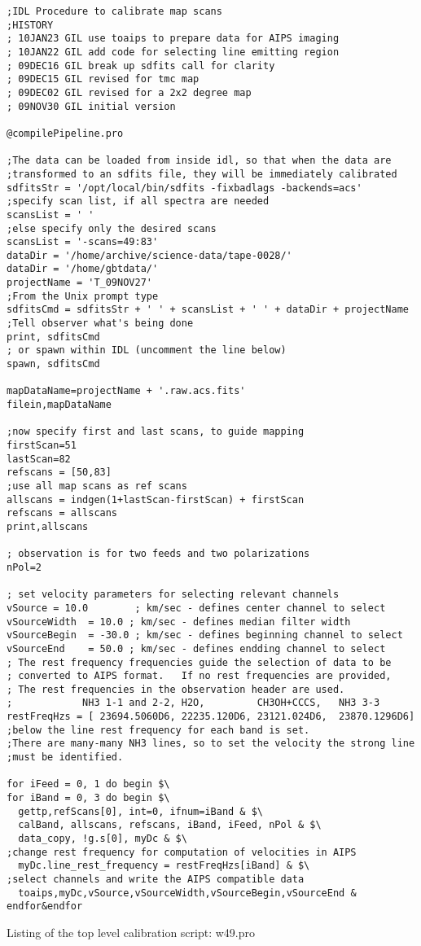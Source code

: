 \documentclass[12pt,twoside]{article}
\begin{document}
\begin{verbatim}
;IDL Procedure to calibrate map scans
;HISTORY
; 10JAN23 GIL use toaips to prepare data for AIPS imaging
; 10JAN22 GIL add code for selecting line emitting region
; 09DEC16 GIL break up sdfits call for clarity
; 09DEC15 GIL revised for tmc map
; 09DEC02 GIL revised for a 2x2 degree map
; 09NOV30 GIL initial version

@compilePipeline.pro

;The data can be loaded from inside idl, so that when the data are
;transformed to an sdfits file, they will be immediately calibrated
sdfitsStr = '/opt/local/bin/sdfits -fixbadlags -backends=acs'
;specify scan list, if all spectra are needed
scansList = ' '
;else specify only the desired scans
scansList = '-scans=49:83'
dataDir = '/home/archive/science-data/tape-0028/'
dataDir = '/home/gbtdata/'
projectName = 'T_09NOV27'
;From the Unix prompt type
sdfitsCmd = sdfitsStr + ' ' + scansList + ' ' + dataDir + projectName
;Tell observer what's being done
print, sdfitsCmd
; or spawn within IDL (uncomment the line below)
spawn, sdfitsCmd

mapDataName=projectName + '.raw.acs.fits'
filein,mapDataName

;now specify first and last scans, to guide mapping
firstScan=51
lastScan=82
refscans = [50,83]
;use all map scans as ref scans
allscans = indgen(1+lastScan-firstScan) + firstScan
refscans = allscans
print,allscans

; observation is for two feeds and two polarizations
nPol=2

; set velocity parameters for selecting relevant channels
vSource = 10.0        ; km/sec - defines center channel to select
vSourceWidth  = 10.0 ; km/sec - defines median filter width
vSourceBegin  = -30.0 ; km/sec - defines beginning channel to select
vSourceEnd    = 50.0 ; km/sec - defines endding channel to select
; The rest frequency frequencies guide the selection of data to be
; converted to AIPS format.   If no rest frequencies are provided,
; The rest frequencies in the observation header are used.
;            NH3 1-1 and 2-2, H2O,         CH3OH+CCCS,   NH3 3-3
restFreqHzs = [ 23694.5060D6, 22235.120D6, 23121.024D6,  23870.1296D6]
;below the line rest frequency for each band is set.
;There are many-many NH3 lines, so to set the velocity the strong line 
;must be identified.  

for iFeed = 0, 1 do begin $\
for iBand = 0, 3 do begin $\
  gettp,refScans[0], int=0, ifnum=iBand & $\
  calBand, allscans, refscans, iBand, iFeed, nPol & $\
  data_copy, !g.s[0], myDc & $\
;change rest frequency for computation of velocities in AIPS
  myDc.line_rest_frequency = restFreqHzs[iBand] & $\
;select channels and write the AIPS compatible data 
  toaips,myDc,vSource,vSourceWidth,vSourceBegin,vSourceEnd & endfor&endfor

\end{verbatim}
\centerline{Listing of the top level calibration script: w49.pro}
\end{document}
